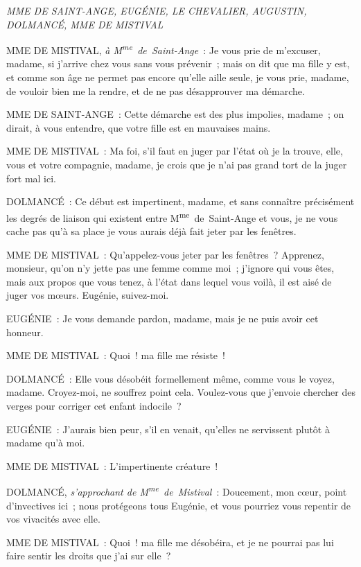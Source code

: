 \documentclass[french,twoside]{book} %
\begin{document}
\textit{MME DE SAINT-ANGE, EUGÉNIE, LE CHEVALIER, AUGUSTIN, DOLMANCÉ, MME DE MISTIVAL}\par
\noindent MME DE MISTIVAL, {\itshape à M\textsuperscript{me} de Saint-Ange} : Je vous prie de m’excuser, madame, si j’arrive chez vous sans vous prévenir ; mais on dit que ma fille y est, et comme son âge ne permet pas encore qu’elle aille seule, je vous prie, madame, de vouloir bien me la rendre, et de ne pas désapprouver ma démarche.\par
MME DE SAINT-ANGE : Cette démarche est des plus impolies, madame ; on dirait, à vous entendre, que votre fille est en mauvaises mains.\par
MME DE MISTIVAL : Ma foi, s’il faut en juger par l’état où je la trouve, elle, vous et votre compagnie, madame, je crois que je n’ai pas grand tort de la juger fort mal ici.\par
DOLMANCÉ : Ce début est impertinent, madame, et sans connaître précisément les degrés de liaison qui existent entre M\textsuperscript{me} de Saint-Ange et vous, je ne vous cache pas qu’à sa place je vous aurais déjà fait jeter par les fenêtres.\par
MME DE MISTIVAL : Qu’appelez-vous jeter par les fenêtres ? Apprenez, monsieur, qu’on n’y jette pas une femme comme moi ; j’ignore qui vous êtes, mais aux propos que vous tenez, à l’état dans lequel vous voilà, il est aisé de juger vos mœurs. Eugénie, suivez-moi.\par
EUGÉNIE : Je vous demande pardon, madame, mais je ne puis avoir cet honneur.\par
MME DE MISTIVAL : Quoi ! ma fille me résiste !\par
DOLMANCÉ : Elle vous désobéit formellement même, comme vous le voyez, madame. Croyez-moi, ne souffrez point cela. Voulez-vous que j’envoie chercher des verges pour corriger cet enfant indocile ?\par
EUGÉNIE : J’aurais bien peur, s’il en venait, qu’elles ne servissent plutôt à madame qu’à moi.\par
MME DE MISTIVAL : L’impertinente créature !\par
DOLMANCÉ, {\itshape s’approchant de M\textsuperscript{me} de Mistival} : Doucement, mon cœur, point d’invectives ici ; nous protégeons tous Eugénie, et vous pourriez vous repentir de vos vivacités avec elle.\par
MME DE MISTIVAL : Quoi ! ma fille me désobéira, et je ne pourrai pas lui faire sentir les droits que j’ai sur elle ?\par
\end{document}
